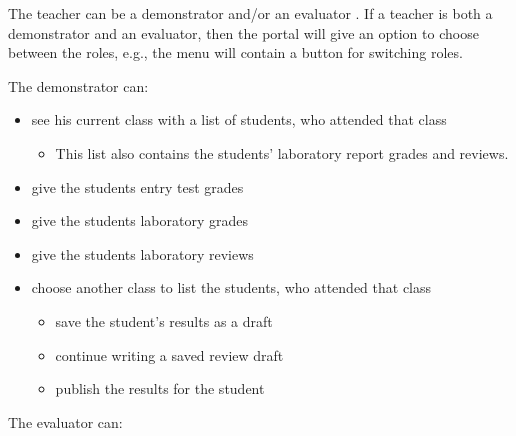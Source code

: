 The teacher can be a demonstrator and/or an evaluator . If a teacher is both a demonstrator and an evaluator, then the portal will give an option to choose between the roles, e.g., the menu will contain a button for switching roles. 


The demonstrator can:

\begin{itemize}
	\item see his current class with a list of students, who attended that class
	\begin{itemize}
		\item This list also contains the students' laboratory report grades and reviews.
	\end{itemize}
	\item give the students entry test grades
	\item give the students laboratory grades
	\item give the students laboratory reviews
	\item choose another class to list the students, who attended that class
	\begin{itemize}
		\item save the student's results as a draft
		\item continue writing a saved review draft
		\item publish the results for the student
	\end{itemize}
\end{itemize}


The evaluator can:

